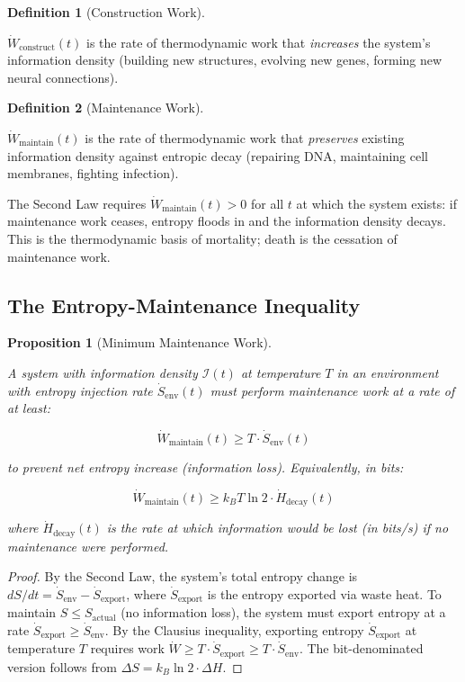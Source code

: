 \documentclass[11pt]{article}
\theoremstyle{plain}
\newtheorem{proposition}[theorem]{Proposition}
\theoremstyle{definition}
\newtheorem{definition}{Definition}
\theoremstyle{remark}
\let\origsubsection\subsection
\renewcommand{\subsection}{\needspace{7\baselineskip}\origsubsection}
\begin{document}
\begin{definition}[Construction Work]
\label{def-construction-work}

$\dot{W}_{\text{construct}}(t)$ is the rate of thermodynamic work that \emph{increases} the system's information density (building new structures, evolving new genes, forming new neural connections).
\end{definition}

\begin{definition}[Maintenance Work]
\label{def-maintenance-work}

$\dot{W}_{\text{maintain}}(t)$ is the rate of thermodynamic work that \emph{preserves} existing information density against entropic decay (repairing DNA, maintaining cell membranes, fighting infection).
\end{definition}

The Second Law requires \(\dot{W}_{\text{maintain}}(t) > 0\) for all
\(t\) at which the system exists: if maintenance work ceases, entropy
floods in and the information density decays. This is the thermodynamic
basis of mortality; death is the cessation of maintenance work.

\subsection{The Entropy-Maintenance
Inequality}\label{the-entropy-maintenance-inequality}

\begin{proposition}[Minimum Maintenance Work]
\label{prop-minimum-maintenance-work}

A system with information density $\mathcal{I}(t)$ at temperature $T$ in an environment with entropy injection rate $\dot{S}_{\text{env}}(t)$ must perform maintenance work at a rate of at least:

$$\dot{W}_{\text{maintain}}(t) \geq T \cdot \dot{S}_{\text{env}}(t)$$

to prevent net entropy increase (information loss). Equivalently, in bits:

$$\dot{W}_{\text{maintain}}(t) \geq k_B T \ln 2 \cdot \dot{H}_{\text{decay}}(t)$$

where $\dot{H}_{\text{decay}}(t)$ is the rate at which information would be lost (in bits/s) if no maintenance were performed.
\end{proposition}

\begin{proof}
By the Second Law, the system's total entropy change is $dS/dt = \dot{S}_{\text{env}} - \dot{S}_{\text{export}}$, where $\dot{S}_{\text{export}}$ is the entropy exported via waste heat. To maintain $S \leq S_{\text{actual}}$ (no information loss), the system must export entropy at a rate $\dot{S}_{\text{export}} \geq \dot{S}_{\text{env}}$. By the Clausius inequality, exporting entropy $\dot{S}_{\text{export}}$ at temperature $T$ requires work $\dot{W} \geq T \cdot \dot{S}_{\text{export}} \geq T \cdot \dot{S}_{\text{env}}$. The bit-denominated version follows from $\Delta S = k_B \ln 2 \cdot \Delta H$.
\end{proof}
\end{document}
